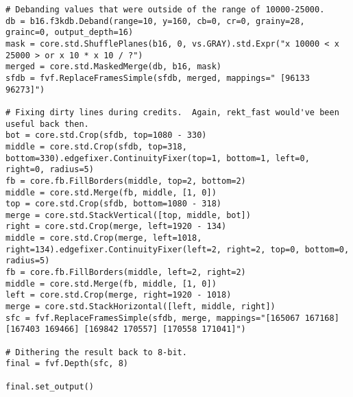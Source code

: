 \documentclass{scrartcl}
\begin{document}
\begin{lstlisting}
# Debanding values that were outside of the range of 10000-25000.
db = b16.f3kdb.Deband(range=10, y=160, cb=0, cr=0, grainy=28, grainc=0, output_depth=16)
mask = core.std.ShufflePlanes(b16, 0, vs.GRAY).std.Expr("x 10000 < x 25000 > or x 10 * x 10 / ?")
merged = core.std.MaskedMerge(db, b16, mask)
sfdb = fvf.ReplaceFramesSimple(sfdb, merged, mappings=" [96133 96273]")

# Fixing dirty lines during credits.  Again, rekt_fast would've been useful back then.
bot = core.std.Crop(sfdb, top=1080 - 330)
middle = core.std.Crop(sfdb, top=318, bottom=330).edgefixer.ContinuityFixer(top=1, bottom=1, left=0, right=0, radius=5)
fb = core.fb.FillBorders(middle, top=2, bottom=2)
middle = core.std.Merge(fb, middle, [1, 0])
top = core.std.Crop(sfdb, bottom=1080 - 318)
merge = core.std.StackVertical([top, middle, bot])
right = core.std.Crop(merge, left=1920 - 134)
middle = core.std.Crop(merge, left=1018, right=134).edgefixer.ContinuityFixer(left=2, right=2, top=0, bottom=0, radius=5)
fb = core.fb.FillBorders(middle, left=2, right=2)
middle = core.std.Merge(fb, middle, [1, 0])
left = core.std.Crop(merge, right=1920 - 1018)
merge = core.std.StackHorizontal([left, middle, right])
sfc = fvf.ReplaceFramesSimple(sfdb, merge, mappings="[165067 167168] [167403 169466] [169842 170557] [170558 171041]")

# Dithering the result back to 8-bit.
final = fvf.Depth(sfc, 8)

final.set_output()

\end{lstlisting}
\end{document}
